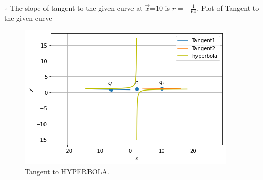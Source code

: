 \documentclass[journal,12pt,twocolumn]{IEEEtran}
\begin{document}
$\therefore$  The slope of tangent to the given curve at $\vec{x}$=10 is
$r=-\frac{1}{64}$.
Plot of Tangent to the given curve -
\begin{figure}[!ht]
    \centering
    \includegraphics[width=\columnwidth]{HYPERBOLA.png}
    \caption{Tangent to HYPERBOLA.}
    \label{fig:Tangent to HYPERBOLA.}
\end{figure}  
\end{document}
